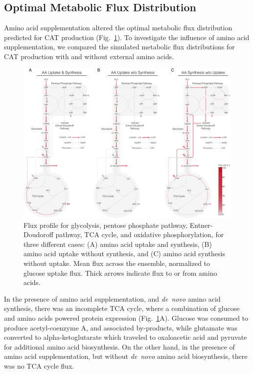 \documentclass[journal=asbcd6,manuscript=article]{achemso}
\begin{document}
\subsection{Optimal Metabolic Flux Distribution}
Amino acid supplementation altered the optimal metabolic flux distribution predicted for CAT production (Fig.~\ref{fig:flux}).
To investigate the influence of amino acid supplementation, we compared the simulated metabolic flux distributions for CAT production with and without external amino acids.
\begin{figure}[t!]
\includegraphics[width=1.00\textwidth]{./figs/Fig-5-FluxDistribition-Optimal.pdf}
\caption{Flux profile for glycolysis, pentose phosphate pathway, Entner-Doudoroff pathway, TCA cycle, and oxidative phosphorylation, for three different cases: (A) amino acid uptake and synthesis, (B) amino acid uptake without synthesis, and (C) amino acid synthesis without uptake. Mean flux across the ensemble, normalized to glucose uptake flux. Thick arrows indicate flux to or from amino acids.}
\label{fig:flux}
\end{figure}
In the presence of amino acid supplementation, and \textit{de~novo} amino acid synthesis, there was an incomplete TCA cycle, where a combination
of glucose and amino acids powered protein expression (Fig.~\ref{fig:flux}A).
Glucose was consumed to produce acetyl-coenzyme A, and associated by-products,
while glutamate was converted to alpha-ketoglutarate which traveled to oxaloacetic acid and pyruvate for additional amino acid biosynthesis.
On the other hand, in the presence of amino acid supplementation, but without \textit{de~novo} amino acid biosynthesis, there was no TCA cycle flux.
\end{document}

